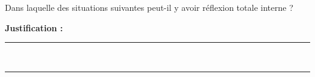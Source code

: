 Dans laquelle des situations suivantes peut-il y avoir réflexion totale interne ?

\choices

\noindent\textbf{Justification :} \hrulefill \\[2.5ex]
\rule{\linewidth}{0.4pt} \\[2.5ex]
\rule{\linewidth}{0.4pt}
\vfill
